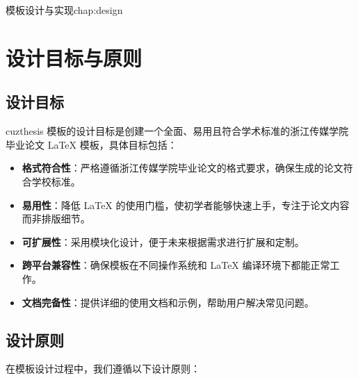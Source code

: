\begin{cuzchapter}{模板设计与实现}{chap:design}


    \section{设计目标与原则}\label{sec:design-goals}

    \subsection{设计目标}

    cuzthesis 模板的设计目标是创建一个全面、易用且符合学术标准的浙江传媒学院毕业论文 LaTeX 模板，具体目标包括：

    \begin{itemize}
        \item \textbf{格式符合性}：严格遵循浙江传媒学院毕业论文的格式要求，确保生成的论文符合学校标准。

        \item \textbf{易用性}：降低 LaTeX 的使用门槛，使初学者能够快速上手，专注于论文内容而非排版细节。

        \item \textbf{可扩展性}：采用模块化设计，便于未来根据需求进行扩展和定制。

        \item \textbf{跨平台兼容性}：确保模板在不同操作系统和 LaTeX 编译环境下都能正常工作。

        \item \textbf{文档完备性}：提供详细的使用文档和示例，帮助用户解决常见问题。
    \end{itemize}

    \subsection{设计原则}

    在模板设计过程中，我们遵循以下设计原则：


\end{cuzchapter}
